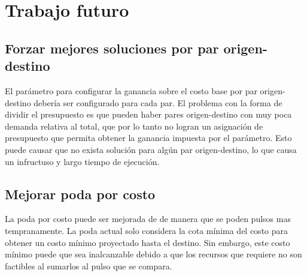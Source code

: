 \documentclass{article}
\begin{document}
  \section*{Trabajo futuro}

  \subsection*{Forzar mejores soluciones por par origen-destino}

  El parámetro para configurar la ganancia sobre el costo base por par origen-destino debería ser configurado para cada par. El problema con la forma de dividir el presupuesto es que pueden haber pares origen-destino con muy poca demanda relativa al total, que por lo tanto no logran un asignación de presupuesto que permita obtener la ganancia impuesta por el parámetro. Esto puede causar que no exista solución para algún par origen-destino, lo que causa un infructuso y largo tiempo de ejecución.

  \subsection*{Mejorar poda por costo}

  La poda por costo puede ser mejorada de de manera que se poden pulsos mas tempranamente. La poda actual solo considera la cota mínima del costo para obtener un costo mínimo proyectado hasta el destino. Sin embargo, este costo mínimo puede que sea inalcanzable debido a que los recursos que requiere no son factibles al sumarlos al pulso que se compara.
\end{document}

